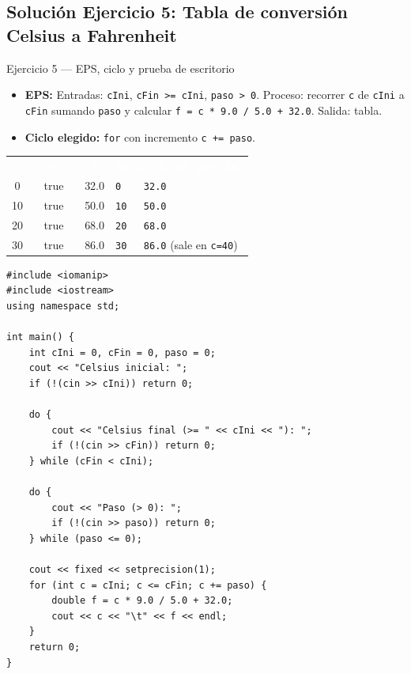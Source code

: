 \documentclass[11pt,letterpaper]{article}
\begin{document}
\subsection{Solución Ejercicio 5: Tabla de conversión Celsius a Fahrenheit}

\begin{solucion}{Ejercicio 5 --- EPS, ciclo y prueba de escritorio}
\begin{itemize}
  \item \textbf{EPS:} Entradas: \texttt{cIni}, \texttt{cFin >= cIni}, \texttt{paso > 0}. Proceso: recorrer \texttt{c} de \texttt{cIni} a \texttt{cFin} sumando \texttt{paso} y calcular \texttt{f = c * 9.0 / 5.0 + 32.0}. Salida: tabla.
  \item \textbf{Ciclo elegido:} \texttt{for} con incremento \texttt{c += paso}.
\end{itemize}
\begin{center}
\footnotesize
\renewcommand{\arraystretch}{1.15}
\begin{tabularx}{0.85\linewidth}{c c c X}
\rowcolor{AzulMarino}
\textcolor{white}{\texttt{c}} & \textcolor{white}{\texttt{c <= 30}} & \textcolor{white}{\texttt{f}} & \textcolor{white}{\textbf{Salida (\texttt{0..30, paso 10})}} \\
0 & true & 32.0 & \texttt{0\ \ \ \ 32.0} \\
10 & true & 50.0 & \texttt{10\ \ \ 50.0} \\
20 & true & 68.0 & \texttt{20\ \ \ 68.0} \\
30 & true & 86.0 & \texttt{30\ \ \ 86.0} (sale en \texttt{c=40}) \\
\bottomrule
\end{tabularx}
\end{center}
\end{solucion}

\begin{lstlisting}[style=cppmonitoria,caption={Solución Ejercicio 5: Conversión Celsius a Fahrenheit (C++)}]
#include <iomanip>
#include <iostream>
using namespace std;

int main() {
    int cIni = 0, cFin = 0, paso = 0;
    cout << "Celsius inicial: ";
    if (!(cin >> cIni)) return 0;

    do {
        cout << "Celsius final (>= " << cIni << "): ";
        if (!(cin >> cFin)) return 0;
    } while (cFin < cIni);

    do {
        cout << "Paso (> 0): ";
        if (!(cin >> paso)) return 0;
    } while (paso <= 0);

    cout << fixed << setprecision(1);
    for (int c = cIni; c <= cFin; c += paso) {
        double f = c * 9.0 / 5.0 + 32.0;
        cout << c << "\t" << f << endl;
    }
    return 0;
}
\end{lstlisting}
\end{document}

